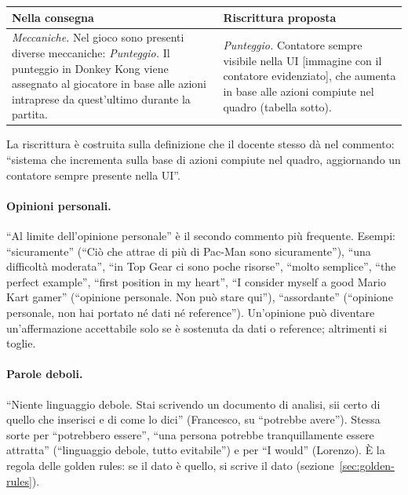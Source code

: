 \begin{center}
\small
\begin{tabular}{@{}p{}p{}@{}}
  \toprule
  \textbf{Nella consegna} & \textbf{Riscrittura proposta} \\
  \midrule
  \emph{Meccaniche.} Nel gioco sono presenti diverse meccaniche:
  \emph{Punteggio.} Il punteggio in Donkey Kong viene assegnato al
  giocatore in base alle azioni intraprese da quest'ultimo durante la
  partita.
  &
  \emph{Punteggio.} Contatore sempre visibile nella UI [immagine con il
  contatore evidenziato], che aumenta in base alle azioni compiute nel
  quadro (tabella sotto). \\
  \bottomrule
\end{tabular}
\end{center}
\noindent La riscrittura è costruita sulla definizione che il docente stesso
dà nel commento: ``sistema che incrementa sulla base di azioni compiute nel
quadro, aggiornando un contatore sempre presente nella UI''.

\paragraph{Opinioni personali.} ``Al limite dell'opinione personale'' è il
secondo commento più frequente. Esempi: ``sicuramente'' (``Ciò che attrae di
più di Pac-Man sono sicuramente''), ``una difficoltà moderata'', ``in Top Gear
ci sono poche risorse'', ``molto semplice'', ``the perfect example'',
``first position in my heart'', ``I consider myself a good Mario Kart
gamer'' (``opinione personale. Non può stare qui''), ``assordante''
(``opinione personale, non hai portato né dati né reference''). Un'opinione
può diventare un'affermazione accettabile solo se è sostenuta da dati o
reference; altrimenti si toglie.

\paragraph{Parole deboli.} ``Niente linguaggio debole. Stai scrivendo un
documento di analisi, sii certo di quello che inserisci e di come lo dici''
(Francesco, su ``potrebbe avere''). Stessa sorte per ``potrebbero essere'',
``una persona potrebbe tranquillamente essere attratta'' (``linguaggio
debole, tutto evitabile'') e per ``I would'' (Lorenzo). È la regola delle
golden rules: se il dato è quello, si scrive il dato
(sezione~\ref{sec:golden-rules}).

